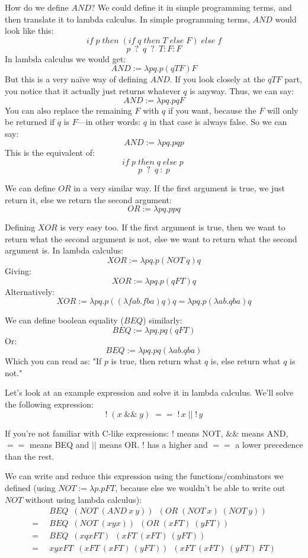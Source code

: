 \documentclass[11pt]{article}
\begin{document}
How do we define \(AND\)? We could define it in simple programming terms, and
then translate it to lambda calculus. In simple programming terms, \(AND\)
would look like this:
\[if\;p\;then\;(if\;q\;then\;T\;else\;F)\;else\;f\]
\[p\enspace ?\enspace q\enspace ?\enspace T:F:F\]
In lambda calculus we would get:
\[AND:=\lambda pq.p(qTF)F\]
But this is a very naïve way of defining \(AND\). If you look closely at the
\(qTF\) part, you notice that it actually just returns whatever \(q\) is
anyway. Thus, we can say:
\[AND:=\lambda pq.pqF\]
You can also replace the remaining \(F\) with \(q\) if you want, because the
\(F\) will only be returned if \(q\) is \(F\)---in other words: \(q\) in that
case is always false. So we can say:
\[AND:=\lambda pq.pqp\]
This is the equivalent of:
\[if\; p\; then\; q\; else\; p\;\]
\[p\enspace ?\enspace q\::\:p\]

We can define \(OR\) in a very similar way. If the first argument is true, we
just return it, else we return the second argument:
\[OR:=\lambda pq.ppq\]

Defining \(XOR\) is very easy too. If the first argument is true, then we want
to return what the second argument is not, else we want to return what the
second argument is. In lambda calculus:
\[XOR:=\lambda pq.p(NOT\:q)q\]
Giving:
\[XOR:=\lambda pq.p(qFT)q\]
Alternatively:
\[XOR:=\lambda pq.p((\lambda fab.fba)q)q=\lambda pq.p(\lambda ab.qba)q\]

We can define boolean equality (\(BEQ\)) similarly:
\[BEQ:=\lambda pq.pq(qFT)\]
Or:
\[BEQ:=\lambda pq.pq(\lambda ab.qba)\]
Which you can read as: "If \(p\) is true, then return what \(q\) is, else
return what \(q\) is not."

Let's look at an example expression and solve it in lambda calculus. We'll
solve the following expression:
\[!\;(x\;\&\&\;y)\;==\;!\,x\;||\;!\,y\]

If you're not familiar with C-like expressions: \(!\) means NOT, \(\&\&\) means
AND, \(==\) means BEQ and \(||\) means OR. \(!\) has a higher and \(==\) a
lower precedence than the rest.

We can write and reduce this expression using the functions/combinators we
defined (using \(NOT:=\lambda p.pFT\), because else we wouldn't be able to
write out \(NOT\) without using lambda calculus):
\begin{align*}
	&\enspace BEQ\enspace
		(NOT\;(AND\:x\:y))\enspace
		(OR\;(NOT\:x)\;(NOT\:y))\\
	=&\enspace BEQ\enspace
		(NOT\;(xyx))\enspace
		(OR\;(xFT)\;(yFT))\\
	=&\enspace BEQ\enspace
		(xqxFT)\enspace
		(xFT\:(xFT)\:(yFT))\\
	=&\enspace xyxFT\enspace
		(xFT\:(xFT)\:(yFT))\enspace
		(xFT\:(xFT)\:(yFT)\:FT)
\end{align*}
\end{document}
